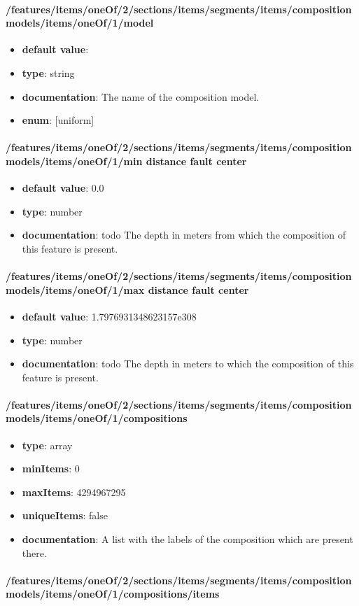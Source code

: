 \paragraph{/features/items/oneOf/2/sections/items/segments/items/composition models/items/oneOf/1/model}
\begin{itemize}\item {\bf default value}: 
\item {\bf type}: string
\item {\bf documentation}: The name of the composition model.
\item {\bf enum}: [uniform]\end{itemize}\paragraph{/features/items/oneOf/2/sections/items/segments/items/composition models/items/oneOf/1/min distance fault center}
\begin{itemize}\item {\bf default value}: 0.0
\item {\bf type}: number
\item {\bf documentation}: todo The depth in meters from which the composition of this feature is present.
\end{itemize}\paragraph{/features/items/oneOf/2/sections/items/segments/items/composition models/items/oneOf/1/max distance fault center}
\begin{itemize}\item {\bf default value}: 1.7976931348623157e308
\item {\bf type}: number
\item {\bf documentation}: todo The depth in meters to which the composition of this feature is present.
\end{itemize}\paragraph{/features/items/oneOf/2/sections/items/segments/items/composition models/items/oneOf/1/compositions}
\begin{itemize}\item {\bf type}: array
\item {\bf minItems}: 0
\item {\bf maxItems}: 4294967295
\item {\bf uniqueItems}: false
\item {\bf documentation}: A list with the labels of the composition which are present there.
\end{itemize}\paragraph{/features/items/oneOf/2/sections/items/segments/items/composition models/items/oneOf/1/compositions/items}
